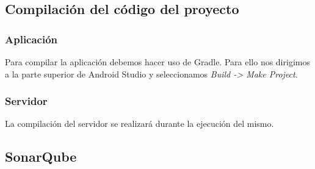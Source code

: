 \subsection{Compilación del código del proyecto}

\subsubsection{Aplicación}

Para compilar la aplicación debemos hacer uso de Gradle. Para ello nos dirigimos a la parte superior de Android Studio y seleccionamos \textit{Build -> Make Project}.

\subsubsection{Servidor}

La compilación del servidor se realizará durante la ejecución del mismo.

\subsection{SonarQube}

